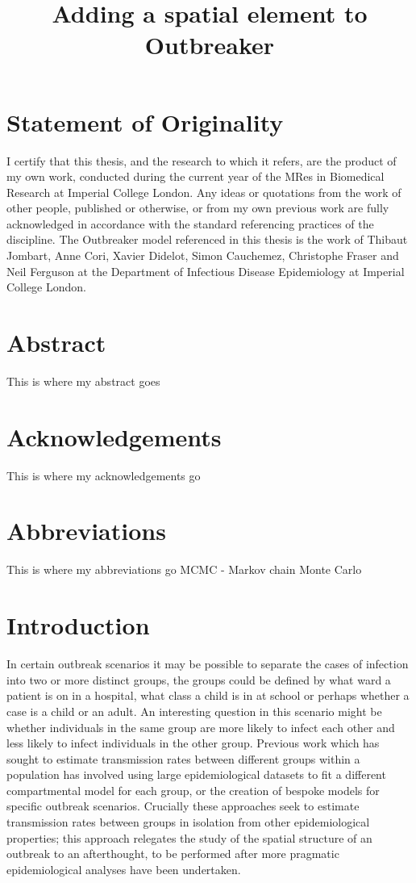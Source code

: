 \documentclass[11pt,a4paper]{report}
\title{Adding a spatial element to Outbreaker}
\begin{document}
\maketitle
\chapter*{Statement of Originality}
\thispagestyle{empty}
\noindent I certify that this thesis, and the research to which it refers, are the product of my own work, conducted during the current year of the MRes in Biomedical Research at Imperial College London. Any ideas or quotations from the work of other people, published or otherwise, or from my own previous work are fully acknowledged in accordance with the standard referencing practices of the discipline. The Outbreaker model referenced in this thesis is the work of Thibaut Jombart, Anne Cori, Xavier Didelot, Simon Cauchemez, Christophe Fraser and Neil Ferguson at the Department of Infectious Disease Epidemiology at Imperial College London.
\newpage

\chapter*{Abstract}
\thispagestyle{empty}
This is where my abstract goes
\newpage

\chapter*{Acknowledgements}
\thispagestyle{empty}
This is where my acknowledgements go
\newpage

\tableofcontents
\pagestyle{plain}
\newpage

\chapter*{Abbreviations}
\thispagestyle{empty}
This is where my abbreviations go
MCMC - Markov chain Monte Carlo
\newpage


\chapter{Introduction}
In certain outbreak scenarios it may be possible to separate the cases of infection into two or more distinct groups, the groups could be defined by what ward a patient is on in a hospital, what class a child is in at school or perhaps whether a case is a child or an adult. An interesting question in this scenario might be whether individuals in the same group are more likely to infect each other and less likely to infect individuals in the other group. Previous work which has sought to estimate transmission rates between different groups within a population has involved using large epidemiological datasets to fit a different compartmental model for each group, or the creation of bespoke models for specific outbreak scenarios. Crucially these approaches seek to estimate transmission rates between groups in isolation from other epidemiological properties; this approach relegates the study of the spatial structure of an outbreak to an afterthought, to be performed after more pragmatic epidemiological analyses have been undertaken.
\end{document}
